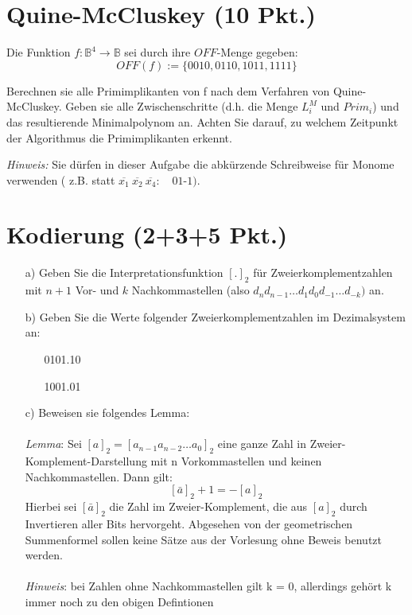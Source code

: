 \documentclass{scrartcl}[11pt]
\begin{document}

\section{Quine-McCluskey (10 Pkt.)}

Die Funktion $f: \mathbb{B}^4 \rightarrow \mathbb{B}$ sei durch ihre $OFF$-Menge gegeben:
$$
OFF(f) := \{0010, 0110, 1011, 1111 \}
$$

Berechnen sie alle Primimplikanten von f nach dem Verfahren von Quine-McCluskey. Geben sie
alle Zwischenschritte (d.h. die Menge $L_i^M$ und $Prim_i$) und das resultierende Minimalpolynom an.
Achten Sie darauf, zu welchem Zeitpunkt der Algorithmus die Primimplikanten erkennt.

\emph{Hinweis:} Sie dürfen in dieser Aufgabe die abkürzende Schreibweise für Monome verwenden ( z.B.
statt $\overline{x_1} \ \overline{x_2} \ \overline{x_4}: \quad 01$-$1)$.

\section{Kodierung (2+3+5 Pkt.)}
\begin{itemize}
  \item[a)] Geben Sie die Interpretationsfunktion $[.]_2$ für Zweierkomplementzahlen mit $n+1$ Vor- und $k$
  Nachkommastellen (also $d_n d_{n-1} \ldots d_1 d_0 d_{-1} \ldots d_{-k})$ an.
  \item[b)] Geben Sie die Werte folgender Zweierkomplementzahlen im Dezimalsystem an:
  \begin{itemize}
    \item[] 0101.10
    \item[] 1001.01
  \end{itemize}
  \item[c)] Beweisen sie folgendes Lemma: \\ \\
 \emph{Lemma}: Sei $[a]_2 = \left[a_{n-1}a_{n-2} \ldots a_0 \right]_2$ eine ganze Zahl in Zweier-Komplement-Darstellung mit n
 Vorkommastellen und keinen Nachkommastellen. Dann gilt:
 $$[\bar{a}]_2 + 1 = -[a]_2$$
 Hierbei sei $[\bar{a}]_2$ die Zahl im Zweier-Komplement, die aus $[a]_2$ durch Invertieren aller Bits
 hervorgeht. Abgesehen von der geometrischen Summenformel sollen keine Sätze aus der Vorlesung ohne
 Beweis benutzt werden. \\ \\
 \emph{Hinweis}: bei Zahlen ohne Nachkommastellen gilt k = 0, allerdings gehört k immer noch zu den
 obigen Defintionen

\end{itemize}
\end{document}
